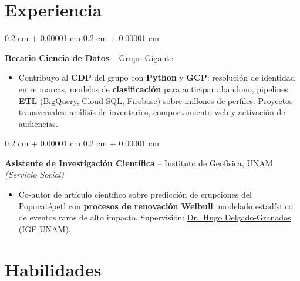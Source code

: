 \documentclass[10pt, letterpaper]{article}
\newenvironment{highlights}{
    \begin{itemize}[
        topsep=0.02 cm,
        parsep=0.05 cm,
        partopsep=0pt,
        itemsep=0pt,
        leftmargin=0.4 cm + 10pt
    ]
}{
    \end{itemize}
}
\newenvironment{onecolentry}{
    \begin{adjustwidth}{
        0.2 cm + 0.00001 cm
    }{
        0.2 cm + 0.00001 cm
    }
}{
    \end{adjustwidth}
}
\let\hrefWithoutArrow\href
\renewcommand{\href}[2]{\hrefWithoutArrow{#1}{\ifthenelse{\equal{#2}{}}{ }{#2 }\raisebox{.15ex}{\footnotesize \faExternalLink*}}}
\begin{document}
    \section{Experiencia}

        \begin{onecolentry}
            \textbf{Becario Ciencia de Datos} -- Grupo Gigante
            \begin{highlights}
                \item Contribuyo al \textbf{CDP} del grupo con \textbf{Python} y \textbf{GCP}: resolución de identidad entre marcas, modelos de \textbf{clasificación} para anticipar abandono, pipelines \textbf{ETL} (BigQuery, Cloud SQL, Firebase) sobre millones de perfiles. Proyectos transversales: análisis de inventarios, comportamiento web y activación de audiencias.
            \end{highlights}
            \end{onecolentry}

        \vspace{0.02 cm}

        \begin{onecolentry}
            \textbf{Asistente de Investigación Científica} -- Instituto de Geofísica, UNAM \textit{(Servicio Social)}
            \begin{highlights}
                \item Co-autor de artículo científico sobre predicción de erupciones del Popocatépetl con \textbf{procesos de renovación Weibull}: modelado estadístico de eventos raros de alto impacto. Supervisión: \hrefWithoutArrow{https://scholar.google.com/citations?user=lDD0DZQAAAAJ}{Dr.\ Hugo Delgado-Granados} (IGF-UNAM).
            \end{highlights}
            \end{onecolentry}


    \section{Habilidades}
\end{document}
